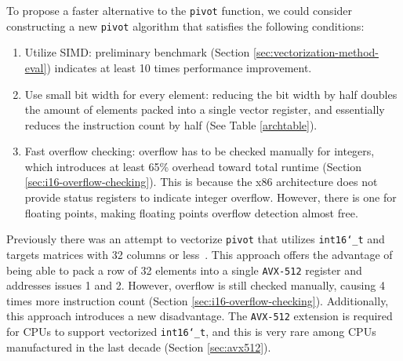 \documentclass[logo,bsc,singlespacing,parskip]{infthesis}
\newcommand{\dtshort}{\texttt{int16\char`_t}}
\begin{document}
To propose a faster alternative to the \texttt{pivot} function, we could
consider constructing a new \texttt{pivot} algorithm that satisfies the
following conditions:
\begin{enumerate}

\item Utilize SIMD: preliminary benchmark (Section
\ref{sec:vectorization-method-eval}) indicates at least 10 times
performance improvement. 

\item Use small bit width for every element: reducing the bit width by half
doubles the amount of elements packed into a single vector register, and
essentially reduces the instruction count by half (See Table \ref{archtable}). 

\item Fast overflow checking: overflow has to be checked manually for integers,
which introduces at least 65\% overhead toward total runtime (Section
\ref{sec:i16-overflow-checking}). This is because the x86 architecture does not
provide status registers to indicate integer overflow. However, there is one for
floating points, making floating points overflow detection almost free. 

\end{enumerate}


Previously there was an attempt to vectorize \texttt{pivot} that utilizes
\dtshort{} and targets matrices with 32 columns or less~\cite{FPL2}. This
approach offers the advantage of being able to pack a row of 32 elements into a
single \texttt{AVX-512} register and addresses issues 1 and 2. However, overflow
is still checked manually, causing 4 times more instruction count (Section
\ref{sec:i16-overflow-checking}). Additionally, this approach introduces a new
disadvantage. The \texttt{AVX-512} extension is required for CPUs to support
vectorized \dtshort{}, and this is very rare among CPUs manufactured in the last
decade (Section \ref{sec:avx512}). 
\end{document}
